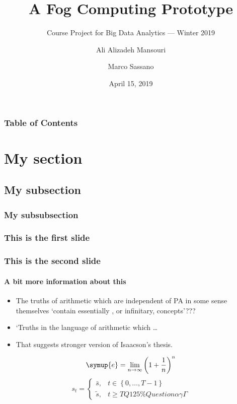 \documentclass[xelatex]{beamer}
\title[Crisis] %
{A Fog Computing Prototype}
\subtitle{Course Project for Big Data Analytics --- Winter 2019}
\author[Ali, Marco] %
{Ali Alizadeh Mansouri \and Marco Sassano}
\institute[Concordia University] %
{
    Concordia University\\
}
\date[April 15, 2019] %
{April 15, 2019}
\begin{document}
\frame{\titlepage}


\begin{frame}
    \frametitle{Table of Contents}
    \tableofcontents[currentsection]
\end{frame}

\section[Section]{My section}
\subsection[Subsection]{My subsection}

\subsubsection[Subsubsection]{My subsubsection}


  \begin{frame}
    \frametitle{This is the first slide}
  \end{frame}

  \begin{frame}
    \frametitle{This is the second slide}
    \framesubtitle{A bit more information about this}

    \begin{itemize}[<+->]
      \item The truths of arithmetic which are independent of PA in some 
      sense themselves `{contain} essentially {\color{blue}{hidden higher-order}},
       or infinitary, concepts'???
      \item `Truths in the language of arithmetic which \ldots
      \item	That suggests stronger version of Isaacson's thesis. 
      \end{itemize}

    \begin{equation*}
      \symup{e} = \lim_{n\to \infty} \left(1 + \frac{1}{n}\right)^n
    \end{equation*}
    \begin{equation*}
      s_{t}=\begin{cases}
      \bar{s}, & t\in \left\lbrace 0,\dots, T-1\right\rbrace  \\
      \tilde{s}, & t\geq T Q125\% Question \alpha \gamma \varGamma
      \end{cases}
    \end{equation*} 
  \end{frame}
\end{document}
